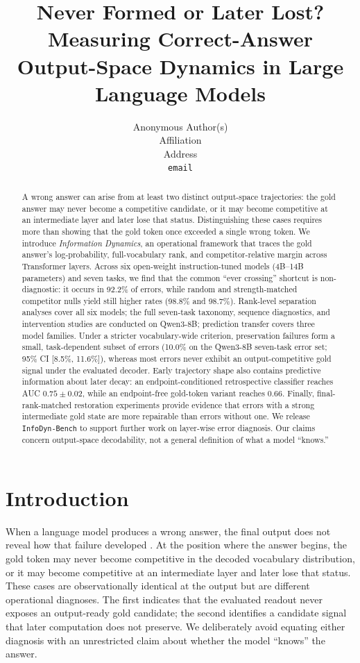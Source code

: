 \documentclass{article} %
\title{Never Formed or Later Lost? Measuring Correct-Answer Output-Space Dynamics in Large Language Models}
\author{Anonymous Author(s) \\
Affiliation \\
Address \\
\texttt{email}
}
\begin{document}
\maketitle

\begin{abstract}
A wrong answer can arise from at least two distinct output-space trajectories: the gold answer may never become a competitive candidate, or it may become competitive at an intermediate layer and later lose that status. Distinguishing these cases requires more than showing that the gold token once exceeded a single wrong token. We introduce \emph{Information Dynamics}, an operational framework that traces the gold answer's log-probability, full-vocabulary rank, and competitor-relative margin across Transformer layers. Across six open-weight instruction-tuned models (4B--14B parameters) and seven tasks, we find that the common ``ever crossing'' shortcut is non-diagnostic: it occurs in 92.2\% of errors, while random and strength-matched competitor nulls yield still higher rates (98.8\% and 98.7\%). Rank-level separation analyses cover all six models; the full seven-task taxonomy, sequence diagnostics, and intervention studies are conducted on Qwen3-8B; prediction transfer covers three model families. Under a stricter vocabulary-wide criterion, preservation failures form a small, task-dependent subset of errors (10.0\% on the Qwen3-8B seven-task error set; 95\% CI [8.5\%, 11.6\%]), whereas most errors never exhibit an output-competitive gold signal under the evaluated decoder. Early trajectory shape also contains predictive information about later decay: an endpoint-conditioned retrospective classifier reaches AUC $0.75\pm0.02$, while an endpoint-free gold-token variant reaches 0.66. Finally, final-rank-matched restoration experiments provide evidence that errors with a strong intermediate gold state are more repairable than errors without one. We release \texttt{InfoDyn-Bench} to support further work on layer-wise error diagnosis. Our claims concern output-space decodability, not a general definition of what a model ``knows.''
\end{abstract}

\section{Introduction}

When a language model produces a wrong answer, the final output does not reveal how that failure developed \citep{ji2023survey, huang2023survey}. At the position where the answer begins, the gold token may never become competitive in the decoded vocabulary distribution, or it may become competitive at an intermediate layer and later lose that status. These cases are observationally identical at the output but are different operational diagnoses. The first indicates that the evaluated readout never exposes an output-ready gold candidate; the second identifies a candidate signal that later computation does not preserve. We deliberately avoid equating either diagnosis with an unrestricted claim about whether the model ``knows'' the answer.
\end{document}
